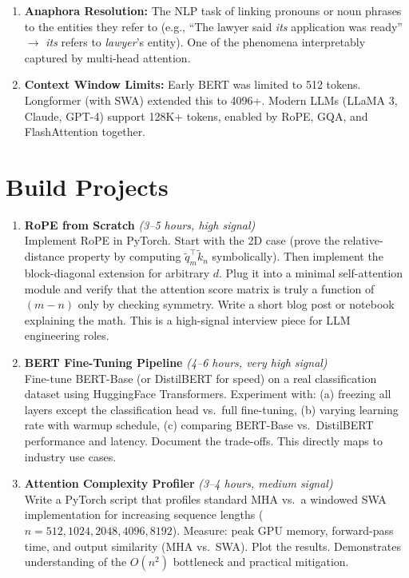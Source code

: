 \documentclass[11pt, a4paper]{article}
\begin{document}
\begin{enumerate}[leftmargin=2em]
  \item \textbf{Anaphora Resolution:} The NLP task of linking pronouns or noun phrases to the entities they refer to (e.g., ``The lawyer said \textit{its} application was ready'' $\to$ \textit{its} refers to \textit{lawyer}'s entity). One of the phenomena interpretably captured by multi-head attention.

  \item \textbf{Context Window Limits:} Early BERT was limited to 512 tokens. Longformer (with SWA) extended this to 4096+. Modern LLMs (LLaMA 3, Claude, GPT-4) support 128K+ tokens, enabled by RoPE, GQA, and FlashAttention together.
\end{enumerate}

\newpage
\section{Build Projects}

\begin{enumerate}[leftmargin=2em]
  \item \textbf{RoPE from Scratch} \textit{(3--5 hours, high signal)}\\
  Implement RoPE in PyTorch. Start with the 2D case (prove the relative-distance property by computing $\tilde{q}_m^\top \tilde{k}_n$ symbolically). Then implement the block-diagonal extension for arbitrary $d$. Plug it into a minimal self-attention module and verify that the attention score matrix is truly a function of $(m - n)$ only by checking symmetry. Write a short blog post or notebook explaining the math. This is a high-signal interview piece for LLM engineering roles.

  \item \textbf{BERT Fine-Tuning Pipeline} \textit{(4--6 hours, very high signal)}\\
  Fine-tune BERT-Base (or DistilBERT for speed) on a real classification dataset using HuggingFace Transformers. Experiment with: (a) freezing all layers except the classification head vs.\ full fine-tuning, (b) varying learning rate with warmup schedule, (c) comparing BERT-Base vs.\ DistilBERT performance and latency. Document the trade-offs. This directly maps to industry use cases.

  \item \textbf{Attention Complexity Profiler} \textit{(3--4 hours, medium signal)}\\
  Write a PyTorch script that profiles standard MHA vs.\ a windowed SWA implementation for increasing sequence lengths ($n = 512, 1024, 2048, 4096, 8192$). Measure: peak GPU memory, forward-pass time, and output similarity (MHA vs.\ SWA). Plot the results. Demonstrates understanding of the $O(n^2)$ bottleneck and practical mitigation.
\end{enumerate}
\end{document}
